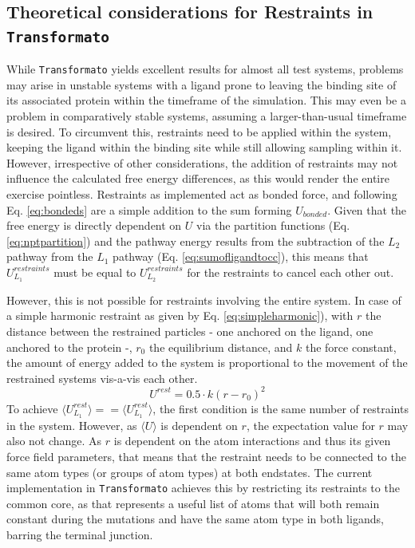 \documentclass[oneside]{scrreprt}
\begin{document}
\subsection{Theoretical considerations for Restraints in \texttt{Transformato}}
While \texttt{Transformato} yields excellent results for almost all test systems, problems may arise in unstable systems with a ligand prone to leaving the binding site of its associated protein within the timeframe of the simulation. This may even be a problem in comparatively stable systems, assuming a larger-than-usual timeframe is desired. To circumvent this, restraints need to be applied within the system, keeping the ligand within the binding site while still allowing sampling within it. However, irrespective of other considerations, the addition of restraints may not influence the calculated free energy differences, as this would render the entire exercise pointless. Restraints as implemented act as bonded force, and following Eq. \ref{eq:bondeds} are a simple addition to the sum forming $U_{bonded}$. Given that the free energy is directly dependent on $U$ via the partition functions (Eq. \ref{eq:nptpartition}) and the pathway energy results from the subtraction of the $L_2$ pathway from the $L_1$ pathway (Eq. \ref{eq:sumofligandtocc}), this means that $U^{restraints}_{L_1}$ must be equal to $U^{restraints}_{L_2}$ for the restraints to cancel each other out.

However, this is not possible for restraints involving the entire system. In case of a simple harmonic restraint as given by Eq. \ref{eq:simpleharmonic}), with $r$ the distance between the restrained particles - one anchored on the ligand, one anchored to the protein -, $r_0$ the equilibrium distance, and $k$ the force constant,  the amount of energy added to the system is proportional to the movement of the restrained systems vis-a-vis each other.
\begin{equation}\label{eq:simpleharmonic}
    U^{rest}=0.5\cdot k(r-r_0)^2 
\end{equation}
To achieve $\langle U^{rest}_{L_1}\rangle == \langle U^{rest}_{L_1}\rangle$, the first condition is the same number of restraints in the system. However, as $\langle U \rangle$ is dependent on $r$, the expectation value for $r$ may also not change. As $r$ is dependent on the atom interactions and thus its given force field parameters, that means that the restraint needs to be connected to the same atom types (or groups of atom types) at both endstates. The current implementation in \texttt{Transformato} achieves this by restricting its restraints to the common core, as that represents a useful list of atoms that will both remain constant during the mutations and have the same atom type in both ligands, barring the terminal junction.
\end{document}

